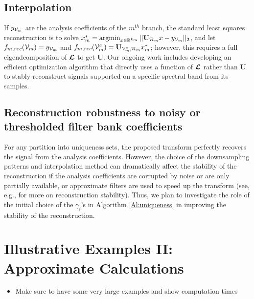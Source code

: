\documentclass[journal, 10pt]{IEEEtran}
\begin{document}
{\subsection{Interpolation}
If $y_{{\mathcal{V}}_m}$ are the analysis coefficients of the $m^{th}$ branch, the standard least squares reconstruction is to solve $x_m^*=\argmin_{x \in \R^{k_m}} ||\mathbf{U}_{{\cal R}_m}x - y_{\V_m} ||_2$, and let $f_{m,{rec}}({\mathcal{V}}_m)=y_{{\mathcal{V}}_m}$ and $f_{m,{rec}}(\V_m^c)=\mathbf{U}_{\V_m^c,{\cal R}_m}x_m^*$; however, this requires a full eigendcomposition of $\boldsymbol{\mathcal{L}}$ to get $\mathbf{U}$. Our ongoing work includes developing an efficient optimization algorithm that directly uses a function of $\boldsymbol{\mathcal{L}}$ rather than $\mathbf{U}$ to stably reconstruct signals supported on a specific spectral band from its samples. 

\subsection{Reconstruction robustness to noisy or thresholded filter bank coefficients} \label{Se:noisy_ext}
For any partition into uniqueness sets, the proposed transform perfectly recovers the signal from the analysis coefficients. However, the choice of the downsampling patterns and interpolation method can dramatically affect the stability of the reconstruction if the analysis coefficients are corrupted by noise or are only partially available, or approximate filters are used to speed up the transform (see, e.g., \cite[Section III.B]{anis2016efficient} for more on reconstruction stability). Thus, we plan to investigate the role of the initial choice of the $\gamma_i$'s in Algorithm \ref{Al:uniqueness} in improving the stability of the reconstruction.

\section{Illustrative Examples II: Approximate Calculations} \label{Se:ill2}
\begin{itemize}
\item Make sure to have some very large examples and show computation times
\end{itemize}
}
\end{document}
